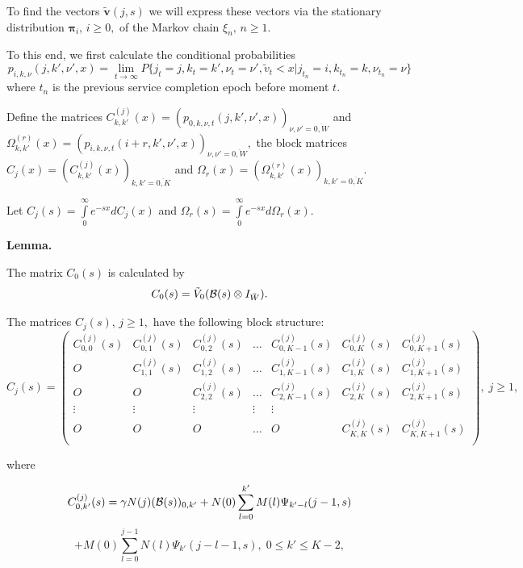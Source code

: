 \documentclass[12pt, a4paper]{article}
\begin{document}
To find the vectors $\tilde{\boldsymbol v}(j,s)$ we will
 express  these vectors  via the stationary distribution  $\boldsymbol{\pi}_i,\, i\geq0,$ of the Markov chain $\xi_n,\,
n\geq1.$



 To this end, we first calculate the conditional probabilities
$$
p_{i,k,\nu}(j,k',\nu', x)=\lim\limits_{t\to\infty}P\{j_t=j,k_t=k',\nu_t=\nu',
\tilde{v}_t<x|j_{t_n}=i,k_{t_n}=k, \nu_{t_n}=\nu\}
$$
 where $t_n$ is the previous service completion epoch before moment $t.$


Define the matrices $C^{(j)}_{k,k'}( x)=(p_{0,k, \nu, t}(j,k',\nu', x))_{\nu, \nu'=\overline{0,W}}$ and $\Omega^{(r)}_{k,k'}( x)=(p_{i,k, \nu, t}(i+r,k',\nu', x))_{\nu, \nu'=\overline{0,W}},$
 the block  matrices $C_j ( x)=(C^{(j)}_{k,k'}( x))_{k,k'=\overline{0,K}} $ and $\Omega_r ( x)=(\Omega^{(r)}_{k,k'}( x))_{k,k'=\overline{0,K}}.$

Let  $C_j(s)=\int\limits_0^\infty e^{-sx}dC_j(x)$ and $\Omega_r(s)=\int\limits_0^\infty e^{-sx}d\Omega_r(x).$




{\bf Lemma.}

 The matrix $C_0(s)$ is calculated by
   $$
     C_0(s) =\tilde V_0 ({\cal B}(s)\otimes I_{\bar W}).
  $$



 The matrices  $C_j(s),\,j\ge1,$ have the following block structure:
 $$
     C_j(s) =\left(\begin{array}{cccccccc}
       C_{0,0}^{(j)}(s)     &  C_{0,1}^{(j)}(s)     &  C_{0,2}^{(j)}(s)   & \ldots  &      C_{0,K-1}^{(j)}(s) &   C_{0,K}^{(j)}(s) &C_{0,K+1}^{(j)}(s)   \\
         O& C_{1,1}^{(j)}(s)      &  C_{1,2}^{(j)}(s)     &  \ldots  &  C_{1,K-1}^{(j)}(s) &   C_{1,K}^{(j)}(s) &C_{1,K+1}^{(j)}(s)  \\
       O& O&       C_{2,2}^{(j)}(s)         &  \ldots  &  C_{2,K-1}^{(j)}(s) &   C_{2,K}^{(j)}(s) &C_{2,K+1}^{(j)}(s)    \\
             \vdots & \vdots &\vdots& \vdots& \vdots         \\
              O& O    &      O        &  \ldots  &    O&  C_{K,K}^{(j)}(s) &C_{K,K+1}^{(j)}(s)    \\
                   \end{array} \right),\; j\ge1,
  $$

  where

  $$ C_{0,k'}^{(j)}(s)=\gamma N(j)({\cal B}(s))_{0,k'}+
N(0)\sum\limits_{l=0}^{k'}M(l) \Psi_{k'-l}(j-1,s)$$$$+
M(0)\sum\limits_{l=0}^{j-1} N(l) \Psi_{k'}(j-l-1, s),\;
0\leq k'\leq K-2,
$$
\end{document}
